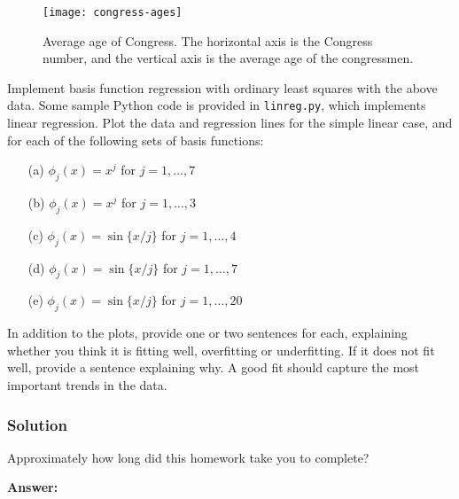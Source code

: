 \documentclass[submit]{harvardml}
\begin{document}
\begin{figure}[h]
\centering
\texttt{[image: congress-ages]}
\caption{Average age of Congress.  The horizontal axis is the Congress number, and the vertical axis is the average age of the congressmen.}
\label{fig:congress}
\end{figure}

\begin{problem}
Implement basis function regression with ordinary least squares with the above
data. Some sample Python code is provided in \verb|linreg.py|, which implements
linear regression.  Plot the data and regression lines for the simple linear
case, and for each of the following sets of basis functions:
\begin{itemize}
  \item[(a)] $\phi_j(x) = x^j$ for $j=1, \ldots, 7$
  \item[(b)] $\phi_j(x) = x^j$ for $j=1, \ldots, 3$
  \item[(c)] $\phi_j(x) = \sin\{ x / j \}$ for $j=1, \ldots, 4$
  \item[(d)] $\phi_j(x) = \sin\{ x / j \}$ for $j=1, \ldots, 7$
  \item[(e)] $\phi_j(x) = \sin\{ x / j \}$ for $j=1, \ldots, 20$
\end{itemize}
  In addition to the plots, provide one or two sentences for each, explaining
  whether you think it is fitting well, overfitting or underfitting.  If it does
  not fit well, provide a sentence explaining why. A good fit should capture the
  most important trends in the data.
  \end{problem}

\subsubsection*{Solution}











\newpage
\begin{problem}[Calibration, 1pt]
Approximately how long did this homework take you to complete?
\end{problem}
\textbf{Answer:}
\end{document}
